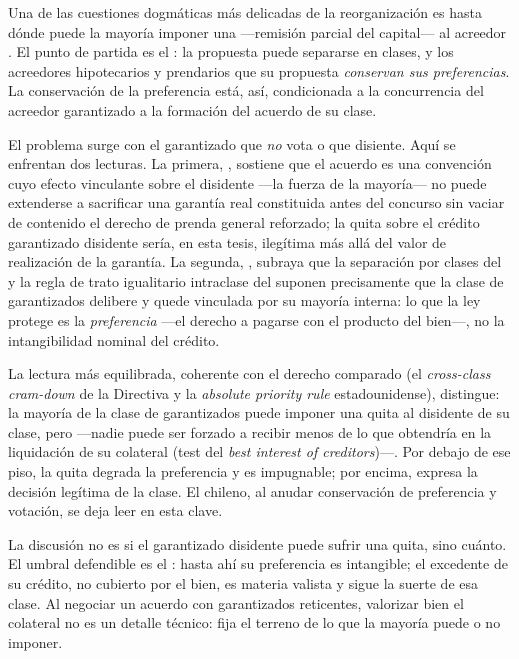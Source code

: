 Una de las cuestiones dogmáticas más delicadas de la reorganización es hasta dónde puede la
mayoría imponer una  ---remisión parcial del capital--- al acreedor
. El punto de partida es el : la propuesta puede
separarse en clases, y los acreedores hipotecarios y prendarios que  su propuesta
\emph{conservan sus preferencias}. La conservación de la preferencia está, así, condicionada a la
concurrencia del acreedor garantizado a la formación del acuerdo de su clase.

El problema surge con el garantizado que \emph{no} vota o que disiente. Aquí se enfrentan dos
lecturas. La primera, , sostiene que el acuerdo es una convención cuyo
efecto vinculante sobre el disidente ---la fuerza de la mayoría--- no puede extenderse a sacrificar
una garantía real constituida antes del concurso sin vaciar de contenido el derecho de prenda
general reforzado; la quita sobre el crédito garantizado disidente sería, en esta tesis, ilegítima
más allá del valor de realización de la garantía. La segunda, , subraya que
la separación por clases del  y la regla de trato igualitario intraclase del 
suponen precisamente que la clase de garantizados delibere y quede vinculada por su mayoría interna:
lo que la ley protege es la \emph{preferencia} ---el derecho a pagarse con el producto del bien---,
no la intangibilidad nominal del crédito.

La lectura más equilibrada, coherente con el derecho comparado (el \emph{cross-class cram-down} de
la Directiva \textcite{ue-directiva-2019-1023} y la \emph{absolute priority rule} estadounidense),
distingue: la mayoría de la clase de garantizados puede imponer una quita al disidente de su clase,
pero  ---nadie puede ser forzado a recibir menos de
lo que obtendría en la liquidación de su colateral (test del \emph{best interest of creditors})---.
Por debajo de ese piso, la quita degrada la preferencia y es impugnable; por encima, expresa la
decisión legítima de la clase. El  chileno, al anudar conservación de preferencia y
votación, se deja leer en esta clave.

\begin{foco}
La discusión no es si el garantizado disidente puede sufrir una quita, sino cuánto. El umbral
defendible es el : hasta ahí su preferencia es
intangible; el excedente de su crédito, no cubierto por el bien, es materia valista y sigue la
suerte de esa clase. Al negociar un acuerdo con garantizados reticentes, valorizar bien el
colateral no es un detalle técnico: fija el terreno de lo que la mayoría puede o no imponer.
\end{foco}

